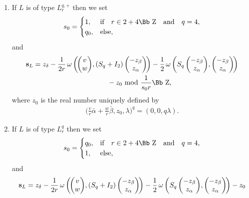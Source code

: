 \documentclass[pdftex]{sigma}
\newcommand\ZZ{{\mbox{\Bb Z}}}
\newcommand\bs{\textbf{{\rm \textbf{s}}}}
\numberwithin{equation}{section}
\begin{document}
\begin{Definition}
\begin{enumerate}
\begin{enumerate}
\item[$(a)$] If $L$ is of type $L^{q,+}_r$ then we set
\begin{gather*}
s_0=\begin{cases}
1,& \text{if}\quad r\in 2+4\ZZ \quad\text{and}\quad q=4,
\\
q_0,& \text{else},
\end{cases}
\end{gather*}
and
\begin{gather*}
\bs_L=z_\delta -\frac{1}{2r}\,\omega\left(\!\begin{pmatrix}v\\w\end{pmatrix}\!, (S_q+I_2)\begin{pmatrix}-z_\beta\\z_\alpha\end{pmatrix}\!\right)
-\frac{1}{2}\,\omega\left(S_q\begin{pmatrix}-z_\beta\\z_\alpha\end{pmatrix}\!, \begin{pmatrix}-z_\beta\\z_\alpha\end{pmatrix}\!\right)
\\ \hphantom{\bs_L=}
{}-z_0\ {\rm mod}\ \frac{1}{s_0r}\ZZ,
\end{gather*}
where $z_0$ is the real number uniquely defined by
\begin{gather*}
\bigg(\frac{v}{r}\bar\alpha+\frac{w}{r}\bar\beta,z_0,\lambda\bigg)^q=(0,0,q\lambda).
\end{gather*}
\item[$(b)$] If $L$ is of type $L^q_r$ then we set
\begin{gather*}
s_0=\begin{cases}
q_0,& \text{if}\quad r\in 2+4\ZZ\quad\text{and}\quad q=4,
\\
1,& \text{else},
\end{cases}
\end{gather*}
and
\begin{gather*}
\bs_L=z_\delta
 -\frac{1}{2r}\,\omega\left(\!\begin{pmatrix}v\\w\end{pmatrix}\!, (S_q+I_2)\begin{pmatrix}-z_\beta\\z_\alpha\end{pmatrix}\!\right)
-\frac{1}{2}\,\omega\left(S_q\begin{pmatrix}-z_\beta\\z_\alpha\end{pmatrix}\!, \begin{pmatrix}-z_\beta\\z_\alpha\end{pmatrix}\!\right)-z_0

\end{gather*}
\end{enumerate}
\end{enumerate}
\end{Definition}
\end{document}
